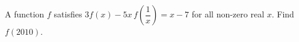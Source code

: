 A function $f$ satisfies $3f(x)-5x\,f\!\left(\dfrac{1}{x}\right)=x-7$ for all non-zero real $x$. Find $f(2010)$.
